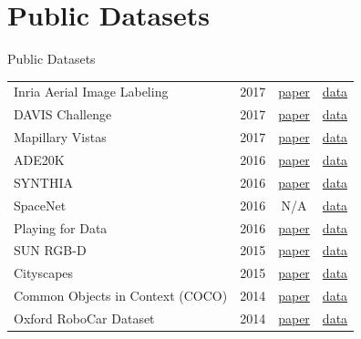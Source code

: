 \documentclass[handout]{beamer}
\begin{document}
\section{Public Datasets}
\begin{frame}{Public Datasets}
\begin{tabular}{lccc}
	 Inria Aerial Image Labeling \dotfill & 2017 & \href{https://hal.inria.fr/hal-01468452/document}{\color{blue}paper} & \href{https://project.inria.fr/aerialimagelabeling/}{\color{blue}data} \\
	 DAVIS Challenge \dotfill & 2017 & \href{https://arxiv.org/abs/1704.00675}{\color{blue}paper} & \href{http://davischallenge.org/challenge2017/index.html}{\color{blue}data} \\
	 Mapillary Vistas \dotfill & 2017 & \href{http://blog.mapillary.com/product/2017/05/03/mapillary-vistas-dataset.html}{\color{blue}paper} & \href{https://www.mapillary.com/dataset/vistas?lat=20\&lng=0\&z=1.5}{\color{blue}data} \\
	 ADE20K \dotfill & 2016 & \href{https://arxiv.org/abs/1608.05442}{\color{blue}paper} & \href{http://groups.csail.mit.edu/vision/datasets/ADE20K/}{\color{blue}data}\\
	 SYNTHIA \dotfill & 2016 & \href{http://www.cv-foundation.org/openaccess/content_cvpr_2016/papers/Ros_The_SYNTHIA_Dataset_CVPR_2016_paper.pdf}{\color{blue}paper} & \href{http://synthia-dataset.net/dataset/}{\color{blue}data}\\
	 SpaceNet \dotfill & 2016 & N/A & \href{https://aws.amazon.com/public-datasets/spacenet/}{\color{blue}data}\\
	 Playing for Data \dotfill & 2016 & \href{https://arxiv.org/abs/1608.02192}{\color{blue}paper} & \href{https://download.visinf.tu-darmstadt.de/data/from_games/}{\color{blue}data}\\
	 SUN RGB-D \dotfill & 2015 & \href{http://rgbd.cs.princeton.edu/paper.pdf}{\color{blue}paper} & \href{http://rgbd.cs.princeton.edu}{\color{blue}data} \\
	 Cityscapes\dotfill & 2015 & \href{https://arxiv.org/abs/1604.01685}{\color{blue}paper} & \href{https://www.cityscapes-dataset.com}{\color{blue}data}\\
	 Common Objects in Context (COCO) & 2014 & \href{https://arxiv.org/abs/1405.0312}{\color{blue}paper} & \href{http://mscoco.org/dataset/\#overview}{\color{blue}data}\\
	 Oxford RoboCar Dataset \dotfill & 2014 & \href{http://robotcar-dataset.robots.ox.ac.uk/images/robotcar_ijrr.pdf}{\color{blue}paper} & \href{http://robotcar-dataset.robots.ox.ac.uk/datasets/}{\color{blue}data}\\

\end{tabular}
\end{frame}
\end{document}
